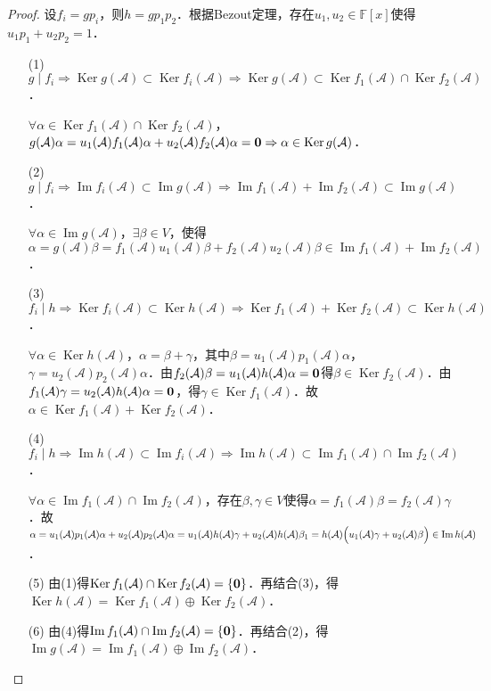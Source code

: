 \documentclass[a4paper,fontset=windows]{ctexbook}
\theoremstyle{definition}
\DeclareMathOperator{\im}{Im}
\DeclareMathOperator{\Ker}{Ker}
\begin{document}
\begin{proof}
设$f_i=gp_i$，则$h=gp_1p_2$．根据Bezout定理，存在$u_1,u_2\in\mathbb{F}[x]$使得$u_1p_1+u_2p_2=1$．
\begin{itemize}
\item[(1)] $g\mid f_i\Rightarrow\Ker g(\mathcal{A})\subset\Ker f_i(\mathcal{A})\Rightarrow\Ker g(\mathcal{A})\subset\Ker f_1(\mathcal{A})\cap\Ker f_2(\mathcal{A})$．

$\forall\alpha\in\Ker f_1(\mathcal{A})\cap\Ker f_2(\mathcal{A})$，$g(\mathcal{A})\alpha=u_1(\mathcal{A})f_1(\mathcal{A})\alpha+u_2(\mathcal{A})f_2(\mathcal{A})\alpha={\bf 0}\Rightarrow\alpha\in\Ker g(\mathcal{A})$．

\item[(2)] $g\mid f_i\Rightarrow\im f_i(\mathcal{A})\subset\im g(\mathcal{A})\Rightarrow\im f_1(\mathcal{A})+\im f_2(\mathcal{A})\subset\im g(\mathcal{A})$．

$\forall\alpha\in\im g(\mathcal{A})$，$\exists\beta\in V$，使得$\alpha=g(\mathcal{A})\beta=f_1(\mathcal{A})u_1(\mathcal{A})\beta+f_2(\mathcal{A})u_2(\mathcal{A})\beta\in\im f_1(\mathcal{A})+\im f_2(\mathcal{A})$．

\item[(3)] $f_i\mid h\Rightarrow\Ker f_i(\mathcal{A})\subset\Ker h(\mathcal{A})\Rightarrow\Ker f_1(\mathcal{A})+\Ker f_2(\mathcal{A})\subset\Ker h(\mathcal{A})$．

$\forall\alpha\in\Ker h(\mathcal{A})$，$\alpha=\beta+\gamma$，其中$\beta=u_1(\mathcal{A})p_1(\mathcal{A})\alpha$，$\gamma=u_2(\mathcal{A})p_2(\mathcal{A})\alpha$．由$f_2(\mathcal{A})\beta=u_1(\mathcal{A})h(\mathcal{A})\alpha={\bf 0}$得$\beta\in\Ker f_2(\mathcal{A})$．由$f_1(\mathcal{A})\gamma=u_2(\mathcal{A})h(\mathcal{A})\alpha={\bf 0}$，得$\gamma\in\Ker f_1(\mathcal{A})$．故$\alpha\in\Ker f_1(\mathcal{A})+\Ker f_2(\mathcal{A})$．

\item[(4)] $f_i\mid h\Rightarrow\im h(\mathcal{A})\subset\im f_i(\mathcal{A})\Rightarrow\im h(\mathcal{A})\subset\im f_1(\mathcal{A})\cap\im f_2(\mathcal{A})$．

$\forall\alpha\in\im f_1(\mathcal{A})\cap\im f_2(\mathcal{A})$，存在$\beta,\gamma\in V$使得$\alpha=f_1(\mathcal{A})\beta=f_2(\mathcal{A})\gamma$．故$\alpha=u_1(\mathcal{A})p_1(\mathcal{A})\alpha+u_2(\mathcal{A})p_2(\mathcal{A})\alpha=u_1(\mathcal{A})h(\mathcal{A})\gamma+u_2(\mathcal{A})h(\mathcal{A})\beta_1=h(\mathcal{A})\Bigl(u_1(\mathcal{A})\gamma+u_2(\mathcal{A})\beta\Bigr)\in\im h(\mathcal{A})$．

\item[(5)] 由(1)得$\Ker f_1(\mathcal{A})\cap\Ker f_2(\mathcal{A})=\{\bf 0\}$．再结合(3)，得$\Ker h(\mathcal{A})=\Ker f_1(\mathcal{A})\oplus\Ker f_2(\mathcal{A})$．

\item[(6)] 由(4)得$\im f_1(\mathcal{A})\cap\im f_2(\mathcal{A})=\{\bf 0\}$．再结合(2)，得$\im g(\mathcal{A})=\im f_1(\mathcal{A})\oplus\im f_2(\mathcal{A})$．\qedhere
\end{itemize}
\end{proof}
\end{document}
